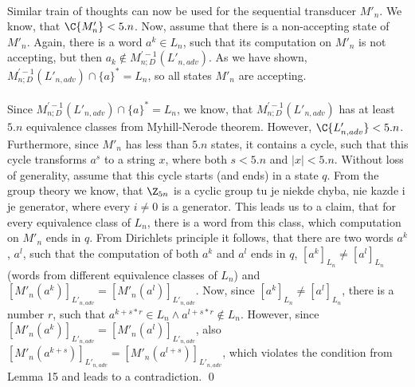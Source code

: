 \paragraph{}
Similar train of thoughts can now be used for the sequential transducer $M'_n$. We know, that $\C{M'_n} < 5.n$. Now, assume that there is a non-accepting state of $M'_n$. Again, there is a word $a^k \in L_n$, such that its computation on $M'_n$ is not accepting, but then $a_k \notin M_{n;D}^{'-1}(L'_{n,adv})$. As we have shown, $M_{n;D}^{'-1}(L'_{n,adv}) \cap \{a\}^* = L_n$, so all states $M'_n$ are accepting.

\paragraph{}
Since $M_{n;D}^{'-1}(L'_{n,adv}) \cap \{a\}^* = L_n$, we know, that $M_{n;D}^{'-1}(L'_{n,adv})$ has at least $5.n$ equivalence classes from Myhill-Nerode theorem. However, $\C{L'_{n,adv}} < 5.n$. Furthermore, since $M'_n$ has less than $5.n$ states, it contains a cycle, such that this cycle transforms $a^s$ to a string $x$, where both $s < 5.n$ and $|x| < 5.n$. Without loss of generality, assume that this cycle starts (and ends) in a state $q$. From the group theory we know, that $\Z_{5n}$ is a cyclic group \color{red}tu je niekde chyba, nie kazde i je generator\color{black}, where every $i \neq 0$ is a generator. This leads us to a claim, that for every equivalence class of $L_n$, there is a word from this class, which computation on $M'_n$ ends in $q$. From Dirichlets principle it follows, that there are two words $a^k$, $a^l$, such that the computation of both $a^k$ and $a^l$ ends in $q$, $[a^k]_{L_n} \neq [a^l]_{L_n}$ (words from different equivalence classes of $L_n$) and $[M'_n(a^k)]_{L'_{n,adv}} = [M'_n(a^l)]_{L'_{n,adv}}$. Now, since $[a^k]_{L_n} \neq [a^l]_{L_n}$, there is a number $r$, such that $a^{k+s*r} \in L_n \wedge a^{l+s*r} \notin L_n$. However, since $[M'_n(a^k)]_{L'_{n,adv}} = [M'_n(a^l)]_{L'_{n,adv}}$, also $[M'_n(a^{k+s})]_{L'_{n,adv}} = [M'_n(a^{l+s})]_{L'_{n,adv}}$, which violates the condition from Lemma 15 and leads to a contradiction. \qed 

